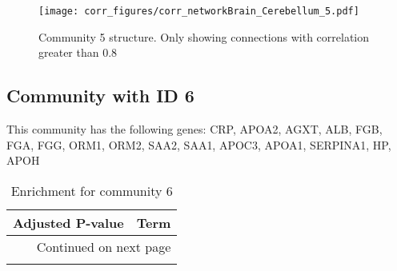 \begin{figure}[h!]
\centering
\texttt{[image: corr\_figures/corr\_networkBrain\_Cerebellum\_5.pdf]}
\caption{Community 5 structure. Only showing connections with correlation greater than 0.8}
\end{figure}




\subsection*{Community with ID 6}
This community has the following genes: CRP, APOA2, AGXT, ALB, FGB, FGA, FGG, ORM1, ORM2, SAA2, SAA1, APOC3, APOA1, SERPINA1, HP, APOH
\\
\begin{longtable}{p{2.4cm}p{14.5cm}}
\caption{Enrichment for community 6}\\
\toprule
Adjusted \newline P-value &                                                                                          Term \\
\midrule
\endhead
\midrule
\multicolumn{2}{r}{{Continued on next page}} \\
\midrule
\endfoot


\end{longtable}
